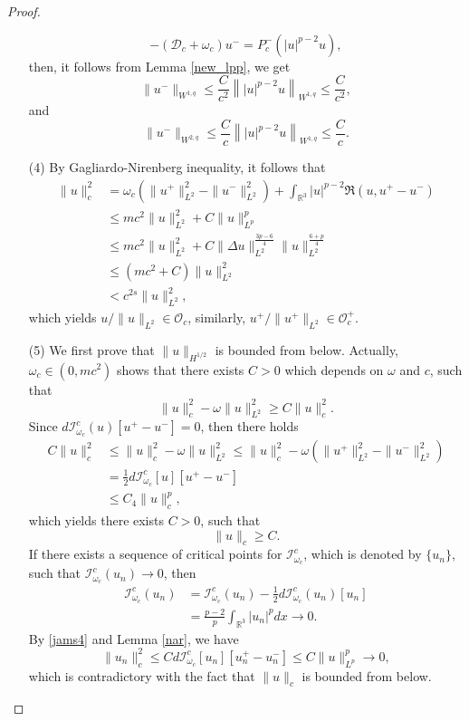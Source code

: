 \documentclass{amsart}
\theoremstyle{plain}
\theoremstyle{definition}
\theoremstyle{remark}
\numberwithin{equation}{section} \numberwithin{figure}{section}
\begin{document}
\begin{proof}
\begin{enumerate}
$$    -(\mathscr{D}_c+\omega_c)u^-= P_c^-\left(|u|^{p-2}u \right),
    $$
    then, it follows from Lemma \ref{new_lpp}, we get
    $$
    \|u^-\|_{W^{1,q}}\leq \frac{C}{c^2}\left\| |u|^{p-2}u\right\|_{W^{1,q}} \leq \frac{C}{c^2},
    $$
    and
    $$
    \|u^-\|_{W^{2,q}}\leq \frac{C}{c}\left\| |u|^{p-2}u\right\|_{W^{1,q}} \leq \frac{C}{c}.
    $$
   \item[(4)] By Gagliardo-Nirenberg inequality, it follows that
   \begin{equation*}
       \begin{split}
           \|u \|_{c}^2&=\omega_c(\|u^+\|_{L^2}^2-\|u ^-\|_{L^2}^2 )+ \int_{\mathbb{R}^3}|u |^{p-2}\Re(u , u ^+- u ^-)\\
           &\leq mc^2\|u\|_{L^2}^2 + C \|u\|_{L^p}^p\\
           &\leq mc^2\|u\|_{L^2}^2 + C\|\Delta u\|_{L^2}^{\frac{3p-6}{4}}\|u\|_{L^2}^{\frac{6+p}{4}}\\
           &\leq (mc^2 + C)\|u\|_{L^2}^2 \\
           & < c^{2s}\|u\|_{L^2}^2,
       \end{split}
   \end{equation*}
   which yields $u/\|u\|_{L^2}\in \mathcal{O}_c$, similarly, 
   $u^+/\|u^+\|_{L^2}\in \mathcal{O}_c^+.$
   \item[(5)]
We first prove that $\|u\|_{H^{1/2}}$ is  bounded from below. Actually,
   $\omega_c\in (0,mc^2)$ shows that there exists $C>0$ which depends on $\omega$ and $c$, such that
   $$
   \|u\|_c^2-\omega\|u\|_{L^2}^2\geqslant C\|u\|_c^2.
   $$
   Since $d\mathcal{I}^{c}_{\omega_c}({u})[u^+- u^-]=0$, then there holds
   \begin{equation}\label{jams4}
       \begin{split}
        C\|u\|_c^2&\leq   \|u\|_c^2-\omega\|u\|_{L^2}^2\leq   \|u\|_c^2- \omega\left( \|u^+\|_{L^2}^2- 
          \|u^-\|_{L^2}^2\right)\\
          &=\frac{1}{2}d\mathcal{I}^c_{\omega_c}[u][u^+- u^-]\\
          &\leq  C_4\|u\|_c^{p},
       \end{split}
   \end{equation}
   which yields there exists $C>0$, such that
   $$
   \|u\|_c\geqslant C.
   $$
   If there exists a sequence of critical points for
   $\mathcal{I}^{c}_{\omega_c}$, which is denoted by $\{u_n\}$,  such that $\mathcal{I}^{c}_{\omega_c}(u_n)\to 0$, then
   \begin{equation*}
       \begin{split}
           \mathcal{I}^{c}_{\omega_c}(u_n)&=\mathcal{I}^{c}_{\omega_c}(u_n)-\frac{1}{2}d\mathcal{I}^{c}_{\omega_c}(u_n)[u_n]\\
           &=\frac{p-2}{p}\int_{\mathbb{R}^3}  |u_n|^p dx\to 0.
       \end{split}
   \end{equation*}
  By \eqref{jams4} and Lemma \ref{nar}, we have
   $$
   \|u_n\|_c^2\leq C d\mathcal{I}^{c}_{\omega_c}[u_n][u_n^+- u_n^-]\leq  C\|u\|_{L^p}^p\to 0,
   $$
   which is contradictory with the fact that $\|u\|_c$ is   bounded from below. 
  \end{enumerate}

\end{proof}
\end{document}
